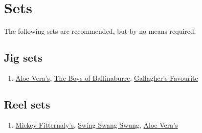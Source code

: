 \documentclass[a4paper,notitlepage,twoside]{book}
\begin{document}

\chapter{Sets}
The following sets are recommended, 
but by no means required.

\section{Jig sets}
\begin{enumerate}
\item \hyperlink{jig:AloeVeras}{Aloe Vera's}, \hyperlink{jig:BoysofBallinaburre}{The Boys of Ballinaburre}, \hyperlink{jig:GallaghersFavourite}{Gallagher's Favourite}
\end{enumerate}

\section{Reel sets}
\begin{enumerate}
\item \hyperlink{reel:MickeyFitternalys}{Mickey Fitternaly's}, \hyperlink{reel:SwingSwangSwung}{Swing Swang Swung}, \hyperlink{reel:AloeVeras}{Aloe Vera's}  
\end{enumerate}


\clearpage
\printindex

\backmatter 

\appendix
\end{document}
